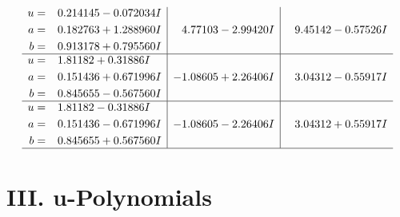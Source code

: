 \documentclass[1p]{elsarticle_modified}
\theoremstyle{definition}
\begin{document}
$$\begin{array}{c|c|c}
\begin{aligned}
u &= \phantom{-}0.214145 - 0.072034 I \\
a &= \phantom{-}0.182763 + 1.288960 I \\
b &= \phantom{-}0.913178 + 0.795560 I\end{aligned}
 & \phantom{-}4.77103 - 2.99420 I & \phantom{-}9.45142 - 0.57526 I \\ \hline\begin{aligned}
u &= \phantom{-}1.81182 + 0.31886 I \\
a &= \phantom{-}0.151436 + 0.671996 I \\
b &= \phantom{-}0.845655 - 0.567560 I\end{aligned}
 & -1.08605 + 2.26406 I & \phantom{-}3.04312 - 0.55917 I \\ \hline\begin{aligned}
u &= \phantom{-}1.81182 - 0.31886 I \\
a &= \phantom{-}0.151436 - 0.671996 I \\
b &= \phantom{-}0.845655 + 0.567560 I\end{aligned}
 & -1.08605 - 2.26406 I & \phantom{-}3.04312 + 0.55917 I\\
 \hline 
 \end{array}$$\newpage
\newpage\renewcommand{\arraystretch}{1}
\centering \section*{ III. u-Polynomials}
\end{document}
